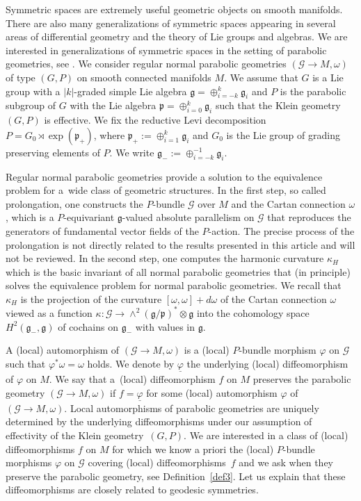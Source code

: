 \documentclass[pdftex]{sigma}
\newcommand{\om}{\omega}
\newcommand{\un}{\underline}
\newcommand{\ba}{\mathcal{G}}
\newcommand{\va}{\varphi}
\newcommand{\fg}{\mathfrak g}
\newcommand{\fp}{\mathfrak p}
\numberwithin{equation}{section}
\begin{document}
Symmetric spaces are extremely useful geometric objects on smooth manifolds. There are also many generalizations of symmetric spaces appearing in several areas of dif\/ferential geometry and the theory of Lie groups and algebras. We are interested in generalizations of symmetric spaces in the setting of parabolic geometries, see \cite[Section~3.1]{parabook}. We consider regular normal parabolic geometries $(\ba\to M,\om)$ of type $(G,P)$ on smooth connected manifolds $M$. We assume that $G$ is a Lie group with a $|k|$-graded simple Lie algebra $\fg=\oplus_{i=-k}^{k}\fg_i$ and $P$ is the parabolic subgroup of $G$ with the Lie algebra $\fp=\oplus_{i=0}^{k}\fg_i$ such that the Klein geometry $(G,P)$ is ef\/fective. We f\/ix the reductive Levi decomposition $P=G_0\rtimes \exp (\fp_+)$, where $\fp_+:=\oplus_{i=1}^{k}\fg_i$ and $G_0$ is the Lie group of grading preserving elements of $P$. We write $\fg_-:=\oplus_{i=-k}^{-1}\fg_i$.

Regular normal parabolic geometries provide a solution to the equivalence problem for a~wide class of geometric structures. In the f\/irst step, so called prolongation, one constructs the $P$-bundle $\ba$ over $M$ and the Cartan connection $\om$, which is a $P$-equivariant $\fg$-valued absolute parallelism on $\ba$ that reproduces the generators of fundamental vector f\/ields of the $P$-action. The precise process of the prolongation is not directly related to the results presented in this article and will not be reviewed. In the second step, one computes the harmonic curvature $\kappa_H$ which is the basic invariant of all normal parabolic geometries that (in principle) solves the equivalence problem for normal parabolic geometries. We recall that $\kappa_H$ is the projection of the curvature $[\om,\om]+d\om$ of the Cartan connection $\om$ viewed as a function $\kappa\colon \ba\to \wedge^2 (\fg/\fp)^*\otimes \fg$ into the cohomology space $H^2(\fg_-,\fg)$ of cochains on $\fg_-$ with values in $\fg$.

A (local) automorphism of $(\ba\to M,\om)$ is a (local) $P$-bundle morphism $\va$ on $\ba$ such that $\va^*\om=\om$ holds. We denote by $\un{\va}$ the underlying (local) dif\/feomorphism of $\va$ on $M$. We say that a~(local) dif\/feomorphism $f$ on $M$ preserves the parabolic geometry $(\ba\to M,\om)$ if $f=\un{\va}$ for some (local) automorphism $\va$ of $(\ba\to M,\om)$. Local automorphisms of parabolic geometries are uniquely determined by the underlying dif\/feomorphisms under our assumption of ef\/fectivity of the Klein geometry~$(G,P)$. We are interested in a class of (local) dif\/feomorphisms $f$ on $M$ for which we know a priori the (local) $P$-bundle morphisms $\va$ on $\ba$ covering (local) dif\/feomor\-phisms~$f$ and we ask when they preserve the parabolic geometry, see Def\/inition~\ref{def3}. Let us explain that these dif\/feomorphisms are closely related to geodesic symmetries.
\end{document}
